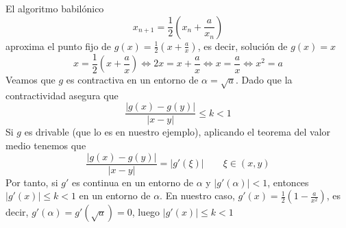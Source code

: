        \begin{ejem}
           El algoritmo babilónico
           $$x_{n+1}=\dfrac{1}{2}\left( x_n + \dfrac{a}{x_n}\right)$$
           aproxima el punto fijo de $g(x)=\frac{1}{2}\left( x + \frac{a}{x}\right)$, es decir, solución de $g(x)=x$ $$x=\frac{1}{2}\left( x + \frac{a}{x}\right) \iff 2x=x+\dfrac{a}{x} \iff x = \dfrac{a}{x} \iff x^2=a$$
           Veamos que $g$ es contractiva en un entorno de $\alpha=\sqrt{a}$. Dado que la contractividad asegura que $$\dfrac{|g(x)-g(y)|}{|x-y|}\leq k <1$$
           Si $g$ es drivable (que lo es en nuestro ejemplo), aplicando el teorema del valor medio tenemos que 
           $$\dfrac{|g(x)-g(y)|}{|x-y|}=|g'(\xi)| \qquad \xi \in (x,y)$$
           Por tanto, si $g'$ es continua en un entorno de $\alpha$ y $|g'(\alpha)|<1$, entonces $|g'(x)|\leq k <1$ en un entorno de $\alpha$. En nuestro caso, $g'(x)=\frac{1}{2}\left(1-\frac{a}{x^2}\right)$, es decir, $g'(\alpha)=g'(\sqrt{a})=0$, luego $|g'(x)|\leq k < 1$
       \end{ejem}
    
